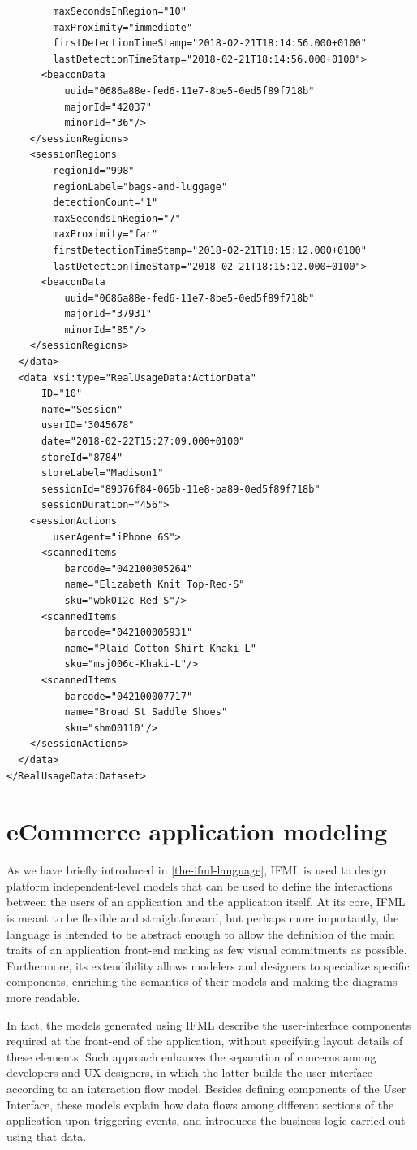 \begin{lstlisting}
        maxSecondsInRegion="10"
        maxProximity="immediate"
        firstDetectionTimeStamp="2018-02-21T18:14:56.000+0100"
        lastDetectionTimeStamp="2018-02-21T18:14:56.000+0100">
      <beaconData
          uuid="0686a88e-fed6-11e7-8be5-0ed5f89f718b"
          majorId="42037"
          minorId="36"/>
    </sessionRegions>
    <sessionRegions
        regionId="998"
        regionLabel="bags-and-luggage"
        detectionCount="1"
        maxSecondsInRegion="7"
        maxProximity="far"
        firstDetectionTimeStamp="2018-02-21T18:15:12.000+0100"
        lastDetectionTimeStamp="2018-02-21T18:15:12.000+0100">
      <beaconData
          uuid="0686a88e-fed6-11e7-8be5-0ed5f89f718b"
          majorId="37931"
          minorId="85"/>
    </sessionRegions>
  </data>
  <data xsi:type="RealUsageData:ActionData"
      ID="10"
      name="Session"
      userID="3045678"
      date="2018-02-22T15:27:09.000+0100"
      storeId="8784"
      storeLabel="Madison1"
      sessionId="89376f84-065b-11e8-ba89-0ed5f89f718b"
      sessionDuration="456">
    <sessionActions
        userAgent="iPhone 6S">
      <scannedItems
          barcode="042100005264"
          name="Elizabeth Knit Top-Red-S"
          sku="wbk012c-Red-S"/>
      <scannedItems
          barcode="042100005931"
          name="Plaid Cotton Shirt-Khaki-L"
          sku="msj006c-Khaki-L"/>
      <scannedItems
          barcode="042100007717"
          name="Broad St Saddle Shoes"
          sku="shm00110"/>
    </sessionActions>
  </data>
</RealUsageData:Dataset>
\end{lstlisting}
\vspace{0.5cm}
\section{eCommerce application modeling}

As we have briefly introduced in \ref{the-ifml-language}, IFML is used to design platform independent-level models that can be used to define the interactions between the users of an application and the application itself. At its core, IFML is meant to be flexible and straightforward, but perhaps more importantly, the language is intended to be abstract enough to allow the definition of the main traits of an application front-end making as few visual commitments as possible. Furthermore, its extendibility  allows modelers and designers to specialize specific components, enriching the semantics of their models and making the diagrams more readable.

In fact, the models generated using IFML describe the user-interface components required at the front-end of the application, without specifying layout details of these elements. Such approach enhances the separation of concerns among developers and UX designers, in which the latter builds the user interface according to an interaction flow model. Besides defining components of the User Interface, these models explain how data flows among different sections of the application upon triggering events, and introduces the business logic carried out using that data.

